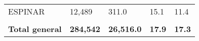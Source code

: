 \begin{tabular}{lllll}
	\cellcolor[HTML]{FF5050}ESPINAR                                & 12,489                                                                & 311.0                                                                            & 15.1                                                                        & 11.4                                                                                \\
	&                                                                       &                                                                                  &                                                                             &                                                                                     \\
	\rowcolor[HTML]{DDEBF7} 
	\textbf{Total   general}                                       & \textbf{284,542}                                                      & \textbf{26,516.0}                                                                & \textbf{17.9}                                                               & \textbf{17.3}                                                                      
\end{tabular}